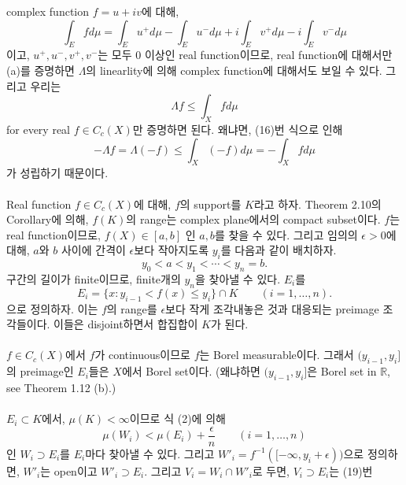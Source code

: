 \documentclass[11pt,reqno]{amsart}
\renewcommand{\(}{\left(}
\renewcommand{\)}{\right)}
\renewcommand{\[}{\left[}
\renewcommand{\]}{\right]}
\newcommand{\R}{\mathbb{R}}
\newcommand{\ep}{\epsilon}
\begin{document}
complex function $f = u + iv$에 대해, \begin{equation*}
  \int_E f d\mu = \int_E u^+ d \mu - \int_E u^- d \mu + i \int_E v^+ d \mu - i \int_E v^- d \mu
\end{equation*}
이고, $u^+, u^-, v^+, v^-$는 모두 0 이상인 real function이므로, real function에 대해서만 (a)를 증명하면
$\Lambda$의 linearlity에 의해 complex function에 대해서도 보일 수 있다. 
그리고 우리는 \begin{equation}
  \Lambda f \le \int_X f d \mu
\end{equation}
for every real $f \in C_c(X)$만 증명하면 된다. 왜냐면, (16)번 식으로 인해
\begin{equation*}
  - \Lambda f = \Lambda (-f) \le \int_X(-f) d \mu = - \int_X f d \mu
\end{equation*}
가 성립하기 때문이다. \\ \\
Real function $f \in C_c(X)$에 대해, $f$의 support를 $K$라고 하자. Theorem 2.10의 Corollary에 의해, 
$f(K)$의 range는 complex plane에서의 compact subset이다. $f$는 real function이므로, $f(X) \in [a, b]$
인 $a, b$를 찾을 수 있다. 그리고 임의의 $\ep > 0$에 대해, $a$와 $b$ 사이에 간격이 $\ep$보다 작아지도록 $y_i$를
다음과 같이 배치하자. \begin{equation}
  y_0 < a < y_1 < \cdots < y_n = b.
\end{equation}
구간의 길이가 finite이므로, finite개의 $y_n$을 찾아낼 수 있다. $E_i$를 \begin{equation}
  E_i = \{ x: y_{i-1} < f(x) \le y_i \} \cap K \qquad (i = 1, \dots, n).
\end{equation}
으로 정의하자. 이는 $f$의 range를 $\ep$보다 작게 조각내놓은 것과 대응되는 preimage 조각들이다. 이들은
disjoint하면서 합집합이 $K$가 된다. \\ \\
$f \in C_c (X)$에서 $f$가 continuous이므로 $f$는 Borel measurable이다. 그래서 $(y_{i-1}, y_i]$의
preimage인 $E_i$들은 $X$에서 Borel set이다. (왜냐하면 $(y_{i-1}, y_i]$은 Borel set in $\R$, 
see Theorem 1.12 (b).) \\ \\
$E_i \subset K$에서, $\mu (K) < \infty$이므로 식 (2)에 의해 \begin{equation}
  \mu(W_i) < \mu(E_i) + \frac{\ep}{n} \qquad (i = 1, \dots, n)
\end{equation}
인 $W_i \supset E_i$를 $E_i$마다 찾아낼 수 있다. 그리고 $W'_i = f^{-1}([- \infty, y_i + \ep))$으로 정의하면, 
$W'_i$는 open이고 $W'_i \supset E_i$. 그리고 $V_i = W_i \cap W'_i$로 두면, $V_i \supset E_i$는 (19)번 
\end{document}
